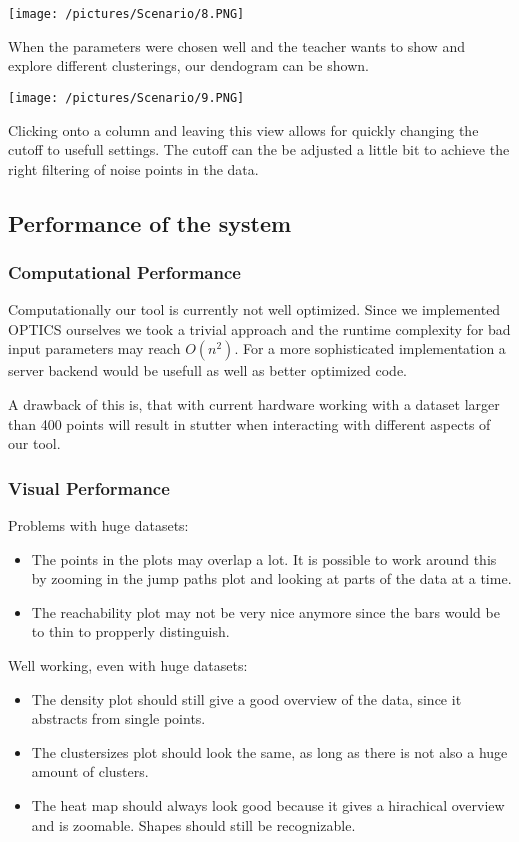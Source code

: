 \documentclass{vgtc}                          %
\begin{document}
\texttt{[image: /pictures/Scenario/8.PNG]}
\begin{flushleft}
When the parameters were chosen well and the teacher wants to show and explore different clusterings, our dendogram can be shown.
\end{flushleft}
\texttt{[image: /pictures/Scenario/9.PNG]}
\begin{flushleft}
Clicking onto a column and leaving this view allows for quickly changing the cutoff to usefull settings. The cutoff can the be adjusted a little bit to achieve the right filtering of noise points in the data.
\end{flushleft}

\subsection{Performance of the system}
\subsubsection{Computational Performance}
\begin{flushleft}
Computationally our tool is currently not well optimized. Since we implemented OPTICS ourselves we took a trivial approach and the runtime complexity for bad input parameters may reach $ O(n^{2}) $. For a more sophisticated implementation a server backend would be usefull as well as better optimized code.
\end{flushleft}
\begin{flushleft}
A drawback of this is, that with current hardware working with a dataset larger than 400 points will result in stutter when interacting with different aspects of our tool.
\end{flushleft}
\subsubsection{Visual Performance}
 Problems with huge datasets:
\begin{itemize}
\item The points in the plots may overlap a lot. It is possible to work around this by zooming in the jump paths plot and looking at parts of the data at a time.
\item The reachability plot may not be very nice anymore since the bars would be to thin to propperly distinguish.
\end{itemize}
Well working, even with huge datasets:
\begin{itemize}
\item The density plot should still give a good overview of the data, since it abstracts from single points.
\item The clustersizes plot should look the same, as long as there is not also a huge amount of clusters.
\item The heat map should always look good because it gives a hirachical overview and is zoomable. Shapes should still be recognizable.
\end{itemize}
\end{document}
